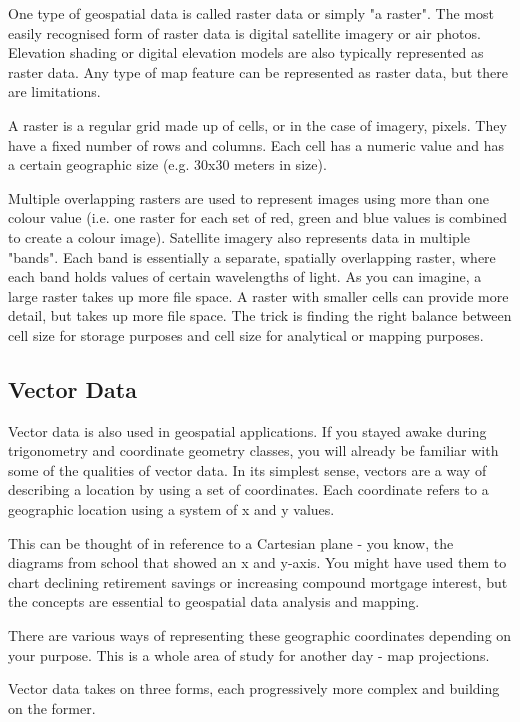 One type of geospatial data is called raster data or simply "a raster". The
most easily recognised form of raster data is digital satellite imagery or
air photos. Elevation shading or digital elevation models are also
typically represented as raster data. Any type of map feature can be
represented as raster data, but there are limitations.

A raster is a regular grid made up of cells, or in the case of imagery,
pixels. They have a fixed number of rows and columns. Each cell has a
numeric value and has a certain geographic size (e.g. 30x30 meters in
size).

Multiple overlapping rasters are used to represent images using more than
one colour value (i.e. one raster for each set of red, green and blue
values is combined to create a colour image). Satellite imagery also
represents data in multiple "bands". Each band is essentially a separate,
spatially overlapping raster, where each band holds values of certain
wavelengths of light. As you can imagine, a large raster takes up more file
space. A raster with smaller cells can provide more detail, but takes up
more file space. The trick is finding the right balance between cell size
for storage purposes and cell size for analytical or mapping purposes.

\subsection{Vector Data}\label{label_vectordata}

Vector data is also used in geospatial applications. If you stayed awake
during trigonometry and coordinate geometry classes, you will already be
familiar with some of the qualities of vector data. In its simplest sense,
vectors are a way of describing a location by using a set of coordinates.
Each coordinate refers to a geographic location using a system of x and y
values.

This can be thought of in reference to a Cartesian plane - you know, the
diagrams from school that showed an x and y-axis. You might have used them
to chart declining retirement savings or increasing compound mortgage
interest, but the concepts are essential to geospatial data analysis and
mapping.

There are various ways of representing these geographic coordinates
depending on your purpose. This is a whole area of study for another day -
map projections.

Vector data takes on three forms, each progressively more complex and
building on the former.  

